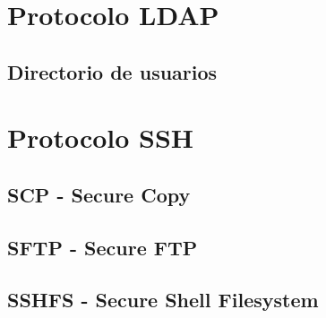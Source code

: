     \section {Protocolo LDAP}
      \subsection {Directorio de usuarios}
    \section {Protocolo SSH}
      \subsection {SCP - Secure Copy}
      \subsection {SFTP - Secure FTP}
      \subsection {SSHFS - Secure Shell Filesystem}
